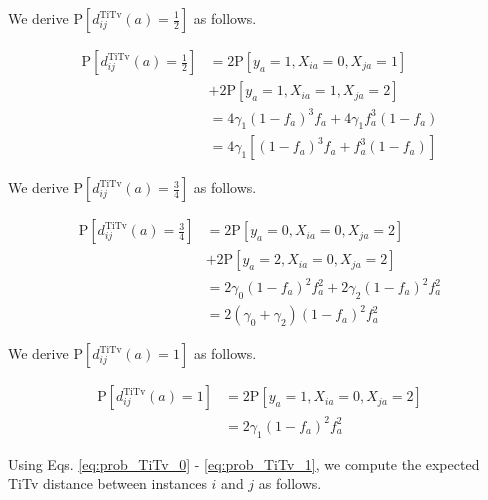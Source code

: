 \documentclass[10pt,letterpaper]{article}\usepackage[]{graphicx}\usepackage[]{color}
\begin{document}
We derive $\text{P}\left[d^\text{TiTv}_{ij}(a) = \frac{1}{2}\right]$ as follows.

\begin{equation}\label{eq:prob_TiTv_0.5}
\begin{aligned}
\text{P}\left[d^\text{TiTv}_{ij}(a) = \frac{1}{2}\right] &= 2 \text{P}\left[y_a = 1, X_{ia} = 0, X_{ja} = 1\right] \\
&+ 2 \text{P}\left[y_a = 1, X_{ia} = 1, X_{ja} = 2\right] \\
&= 4 \gamma_1 (1 - f_a)^3 f_a + 4 \gamma_1 f^3_a (1 - f_a) \\
&= 4 \gamma_1 \left[(1 - f_a)^3 f_a + f^3_a (1 - f_a)\right]
\end{aligned}
\end{equation}

We derive $\text{P}\left[d^\text{TiTv}_{ij}(a) = \frac{3}{4}\right]$ as follows.

\begin{equation}\label{eq:prob_TiTv_0.75}
\begin{aligned}
\text{P}\left[d^\text{TiTv}_{ij}(a) = \frac{3}{4}\right] &= 2 \text{P}\left[y_a = 0, X_{ia} = 0, X_{ja} = 2\right] \\
&+ 2 \text{P}\left[y_a = 2, X_{ia} = 0, X_{ja} = 2\right] \\
&= 2 \gamma_0 (1 - f_a)^2 f^2_a + 2 \gamma_2 (1 - f_a)^2 f^2_a \\
&= 2(\gamma_0 + \gamma_2)(1 - f_a)^2 f^2_a
\end{aligned}
\end{equation}

We derive $\text{P}\left[d^\text{TiTv}_{ij}(a) = 1\right]$ as follows.

\begin{equation}\label{eq:prob_TiTv_1}
\begin{aligned}
\text{P}\left[d^\text{TiTv}_{ij}(a) = 1\right] &= 2 \text{P}\left[y_a = 1, X_{ia} = 0, X_{ja} = 2\right] \\
&= 2 \gamma_1 (1 - f_a)^2 f^2_a
\end{aligned}
\end{equation}

Using Eqs. \ref{eq:prob_TiTv_0} - \ref{eq:prob_TiTv_1}, we compute the expected TiTv distance between instances $i$ and $j$ as follows.
\end{document}
